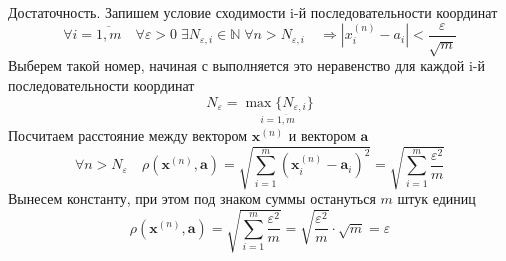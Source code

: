 \begin{enumerate}
  Достаточность. Запишем условие сходимости i-й последовательности координат
  $$
  \forall i = \overline{1,m} \quad \forall \varepsilon > 0 \; \exists N_{\varepsilon, i} \in \mathbb {N} \; \forall n > N_{\varepsilon, i} \quad \Rightarrow |x^{(n)}_i - a_i| < \frac{\varepsilon}{\sqrt{m}}
  $$
  Выберем такой номер, начиная с выполняется это неравенство для каждой i-й последовательности координат
  $$
  N_{\varepsilon} = \underset{i=\overline{1, m}}{\max\{N_{\varepsilon, i}\}}
  $$
  Посчитаем расстояние между вектором $\textbf {x}^{(n)}$ и вектором $\textbf {a}$
  $$
  \forall n > N_{\varepsilon} \quad \rho(\textbf {x}^{(n)}, \textbf {a}) = \sqrt{\sum\limits_{i=1}^m (\textbf {x}^{(n)}_i - \textbf {a}_i)^2} = \sqrt{\sum\limits_{i=1}^m \frac{{\varepsilon}^2}{m}}
  $$
  Вынесем константу, при этом под знаком суммы остануться $m$ штук единиц
  $$
  \rho(\textbf {x}^{(n)}, \textbf {a}) = \sqrt{\sum\limits_{i=1}^m \frac{{\varepsilon}^2}{m}} = \sqrt{\frac{{\varepsilon}^2}{m}} \cdot \sqrt{m} = \varepsilon
  $$
\end{enumerate}
